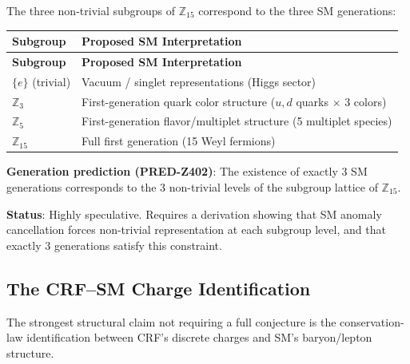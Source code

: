 \documentclass[12pt, a4paper]{article}
\begin{document}
\begin{openqbox}[title={CONJ-Z405 (Generation Conjecture) --- Speculative}]
The three non-trivial subgroups of $\mathbb{Z}_{15}$ correspond
to the three SM generations:

{\small
\setlength{\LTpre}{4pt}
\setlength{\LTpost}{4pt}
\renewcommand{\arraystretch}{1.30}
\begin{longtable}{>{\centering\arraybackslash}p{2.5cm}
                  >{\raggedright\arraybackslash}p{9cm}}
\toprule
\textbf{Subgroup} & \textbf{Proposed SM Interpretation}\\
\midrule
\endfirsthead
\toprule
\textbf{Subgroup} & \textbf{Proposed SM Interpretation}\\
\midrule
\endhead
\bottomrule
\endlastfoot
$\{e\}$ (trivial)
  & Vacuum / singlet representations (Higgs sector) \\
$\mathbb{Z}_3$
  & First-generation quark color structure
    ($u, d$ quarks $\times$ 3 colors) \\
$\mathbb{Z}_5$
  & First-generation flavor/multiplet structure
    (5 multiplet species) \\
$\mathbb{Z}_{15}$
  & Full first generation (15 Weyl fermions) \\
\end{longtable}
}

\textbf{Generation prediction (PRED-Z402)}: The existence of
exactly 3 SM generations corresponds to the 3 non-trivial levels
of the subgroup lattice of $\mathbb{Z}_{15}$.

\textbf{Status}: Highly speculative. Requires a derivation
showing that SM anomaly cancellation forces non-trivial
representation at each subgroup level, and that exactly
3 generations satisfy this constraint.
\end{openqbox}

\subsection{The CRF--SM Charge Identification}
\label{sec:identification}

The strongest structural claim not requiring a full conjecture
is the conservation-law identification between CRF's discrete
charges and SM's baryon/lepton structure.
\end{document}
